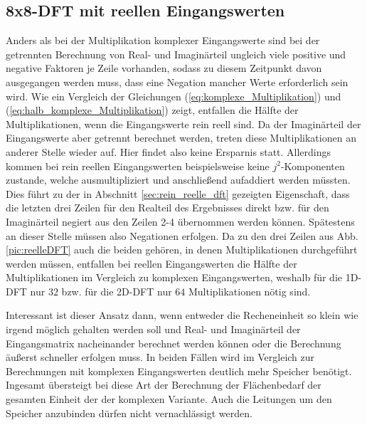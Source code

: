 \subsection{8x8-DFT mit reellen Eingangswerten}\label{sec:RelleEingangswerte}
Anders als bei der Multiplikation komplexer Eingangswerte sind bei der getrennten Berechnung von Real- und Imaginärteil ungleich viele positive 
und negative Faktoren je Zeile vorhanden, sodass zu diesem Zeitpunkt davon ausgegangen werden muss, dass eine Negation mancher Werte erforderlich sein wird. 
Wie ein Vergleich der Gleichungen (\ref{eq:komplexe_Multiplikation}) und (\ref{eq:halb_komplexe_Multiplikation}) zeigt, entfallen die Hälfte der Multiplikationen, wenn die
Eingangswerte rein reell sind. Da der Imaginärteil der Eingangswerte aber getrennt berechnet werden, treten diese Multiplikationen an anderer Stelle wieder auf.
Hier findet also keine Ersparnis statt.
Allerdings kommen bei rein reellen Eingangswerten beispielsweise keine $j^2$-Komponenten zustande, welche ausmultipliziert und anschließend aufaddiert werden müssten. 
Dies führt zu der in Abschnitt \ref{sec:rein_reelle_dft} gezeigten Eigenschaft, dass die letzten drei Zeilen für den Realteil des Ergebnisses direkt bzw. für den Imaginärteil 
negiert aus den Zeilen 2-4 übernommen werden können. Spätestens an dieser Stelle müssen also Negationen erfolgen.
Da zu den drei Zeilen aus Abb. \ref{pic:reelleDFT} auch die beiden gehören, in denen Multiplikationen durchgeführt werden müssen, entfallen bei reellen Eingangswerten die 
Hälfte der Multiplikationen im Vergleich zu komplexen Eingangswerten, weshalb für die 1D-DFT nur $32$ bzw. für die 2D-DFT nur $64$ Multiplikationen nötig sind.

Interessant ist dieser Ansatz dann, wenn entweder die Recheneinheit so klein wie irgend möglich gehalten werden soll und Real- und Imaginärteil der Eingangsmatrix nacheinander
berechnet werden können oder die Berechnung äußerst schneller erfolgen muss. In beiden Fällen wird im Vergleich zur Berechnungen mit komplexen Eingangswerten deutlich mehr
Speicher benötigt.
Ingesamt übersteigt bei diese Art der Berechnung der Flächenbedarf der gesamten Einheit der der komplexen Variante. Auch die Leitungen um den Speicher anzubinden dürfen 
nicht vernachlässigt werden.



